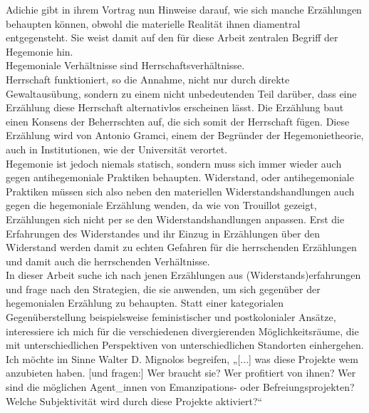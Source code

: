 Adichie gibt in ihrem Vortrag nun Hinweise darauf, wie sich manche
Erzählungen behaupten können, obwohl die materielle Realität ihnen diamentral
entgegensteht. Sie weist damit auf den für diese Arbeit zentralen Begriff der
Hegemonie hin.\\
Hegemoniale Verhältnisse sind
Herrschaftsverhältnisse.\footnotemark{}\\
Herrschaft
funktioniert, so die Annahme, nicht nur durch direkte Gewaltausübung, sondern
zu einem nicht unbedeutenden Teil darüber, dass eine Erzählung diese Herrschaft
alternativlos erscheinen lässt. Die Erzählung baut einen Konsens der
Beherrschten auf, die sich somit der Herrschaft fügen. Diese Erzählung wird von
Antonio Gramci, einem der Begründer der Hegemonietheorie, auch in
Institutionen, wie der Universität verortet.\\
Hegemonie ist jedoch niemals statisch, sondern muss sich immer wieder auch
gegen antihegemoniale Praktiken behaupten. Widerstand, oder antihegemoniale
Praktiken müssen sich also neben den materiellen Widerstandshandlungen auch
gegen die hegemoniale Erzählung wenden, da wie von Trouillot gezeigt,
Erzählungen sich nicht per se den Widerstandshandlungen anpassen. Erst die
Erfahrungen des Widerstandes und ihr Einzug in Erzählungen über den Widerstand
werden damit zu echten Gefahren für die herrschenden Erzählungen und damit auch
die herrschenden Verhältnisse.\\


\noindent In dieser Arbeit suche ich nach jenen Erzählungen aus (Widerstands)erfahrungen
und frage nach den Strategien, die sie anwenden, um sich gegenüber der
hegemonialen Erzählung zu behaupten. Statt einer kategorialen Gegenüberstellung
beispielsweise feministischer und postkolonialer Ansätze, interessiere ich mich
für die verschiedenen divergierenden Möglichkeitsräume, die mit
unterschiedlichen Perspektiven von unterschiedlichen Standorten einhergehen.
Ich möchte im Sinne Walter D. Mignolos begreifen, „[...] was diese Projekte wem
anzubieten haben. [und fragen:] Wer braucht sie? Wer profitiert von ihnen? Wer
sind die möglichen Agent\_innen von Emanzipations- oder Befreiungsprojekten?
Welche Subjektivität wird durch diese Projekte
aktiviert?“\footnotemark{}\\

